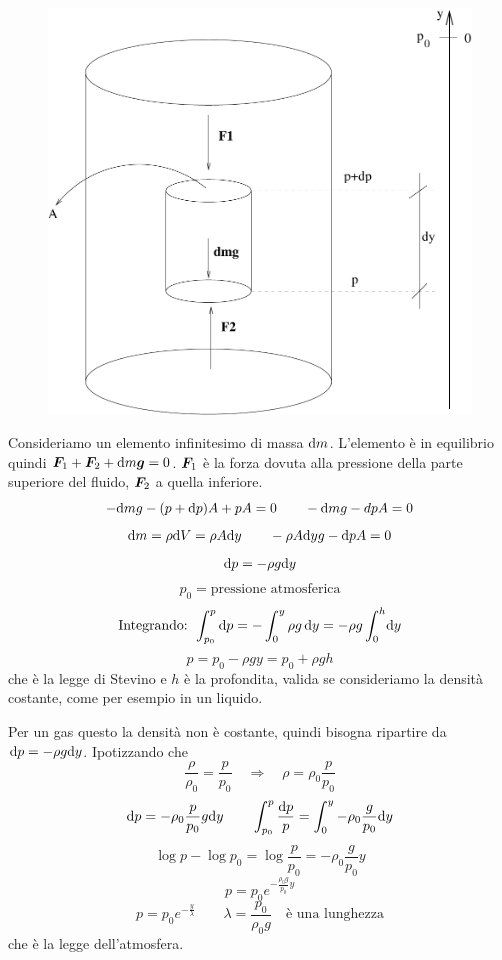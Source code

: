 \label{stevino11}
\begin{figure}[htbp]
   \centering
   \includegraphics[scale=0.4]{immagini/fisica1/legge_di_stevino1}
\end{figure}

Consideriamo un elemento infinitesimo di massa $\mathrm{d} m$. L'elemento è in equilibrio quindi $\boldsymbol{F}_1+\boldsymbol{F}_2+\mathrm{d} m\boldsymbol{g}=0$. $\boldsymbol{F}_1$ è la forza dovuta alla pressione della parte superiore del fluido, $\boldsymbol{F}_2$ a quella inferiore.
\[-\mathrm{d} mg-(p+\mathrm{d} p)A+pA=0\qquad -\mathrm{d} mg-dpA=0\]
\[\mathrm{d} m=\rho \mathrm{d} V=\rho A\mathrm{d} y\qquad -\rho A\mathrm{d} y g-\mathrm{d} p A=0\]
\[\mathrm{d} p=-\rho g \mathrm{d} y\]
\[p_0=\text{pressione atmosferica}\]
\[\text{Integrando: }\int_{p_0}^p \mathrm{d} p=-\int_0^y \rho g\,\mathrm{d} y=-\rho g\int_0^h\!\mathrm{d} y\]
\[p=p_0-\rho g y = p_0+\rho g h\]
che è la legge di Stevino e $h$ è la profondita, valida se consideriamo la densità costante, come per esempio in un liquido.

Per un gas questo la densità non è costante, quindi bisogna ripartire da $\mathrm{d} p=-\rho g \mathrm{d} y$. Ipotizzando che \[\frac{\rho}{\rho_0}=\frac{p}{p_0}\quad\Rightarrow\quad \rho=\rho_0\frac{p}{p_0}\]
\[\mathrm{d} p=-\rho_0\frac{p}{p_0}g\mathrm{d} y\qquad \int_{p_0}^p \frac{\mathrm{d} p}{p}=\int_0^y -\rho_0\frac{g}{p_0}\mathrm{d} y\]
\[\log p-\log p_0=\log\frac{p}{p_0}=-\rho_0\frac{g}{p_0}y\]
\begin{equation}
   p=p_0e^{-\frac{\rho_0 g}{p_0}y}
   \label{legge_atmosfera}
\end{equation}
\[p=p_0e^{-\frac{y}{\lambda}}\qquad \lambda=\frac{p_0}{\rho_0 g}\quad \text{è una lunghezza}\]
che è la legge dell'atmosfera.

